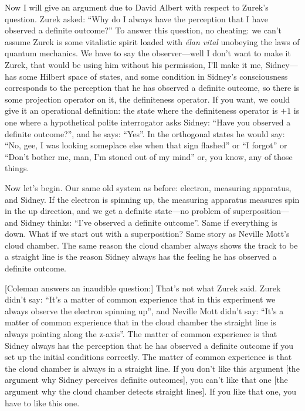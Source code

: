 \documentclass[12pt,nofootinbib]{revtex4}
\begin{document}
Now I will give an argument due to David Albert \cite{Albert94} with respect to Zurek's question. Zurek asked: ``Why do I always have the perception that I have observed a definite outcome?'' To answer this question, no cheating: we can't assume Zurek is some vitalistic spirit loaded with \emph{élan vital} unobeying the laws of quantum mechanics. We have to say the observer---well I don't want to make it Zurek, that would be using him without his permission, I'll make it me, Sidney---has some Hilbert space of states, and some condition in Sidney's consciousness corresponds to the perception that he has observed a definite outcome, so there is some projection operator on it, the definiteness operator.
If you want, we could give it an operational definition: the state
where the definiteness operator is $+1$ is one where a hypothetical polite interrogator asks Sidney: ``Have you observed a definite outcome?'', and he says: ``Yes''. In the orthogonal states he would say: ``No, gee, I was looking someplace else when that sign flashed'' or ``I forgot'' or ``Don't bother me, man, I'm stoned out of my mind'' or, you know, any of those things.

Now let's begin. Our same old system as before: electron, measuring apparatus, and Sidney. If the electron is spinning up, the measuring apparatus measures spin in the up direction, and we get a definite state---no problem of superposition---and Sidney thinks: ``I've observed a definite outcome''. Same if everything is down. What if we start out with a superposition? Same story as Neville Mott's cloud chamber. The same reason the cloud chamber always shows the track to be a straight line is the reason Sidney always has the feeling he has observed a definite outcome.


[Coleman answers an inaudible question:]
That's not what Zurek said. Zurek didn't say: ``It's a matter of common experience that in this experiment we always observe the electron spinning up'', and Neville Mott didn't say: ``It's a matter of common experience that in the cloud chamber the straight line is always pointing along the z-axis''. The matter of common experience is that Sidney always has the perception that he has observed a definite outcome if you set up the initial conditions correctly. The matter of common experience is that the cloud chamber is always in a straight line. If you don't like this argument [the argument why Sidney perceives definite outcomes], you can't like that one [the argument why the cloud chamber detects straight lines]. If you like that one, you have to like this one.
\end{document}
